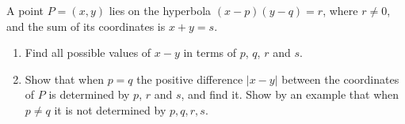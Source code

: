 A point $P=(x,y)$ lies on the hyperbola $(x-p)(y-q)=r$, where $r\ne0$, and the sum of its coordinates is $x+y=s$.
\begin{enumerate}
\item[(a)] Find all possible values of $x-y$ in terms of $p$, $q$, $r$ and $s$.
\item[(b)] Show that when $p=q$ the positive difference $|x-y|$ between the coordinates of $P$ is determined by $p$, $r$ and $s$, and find it. Show by an example that when $p\ne q$ it is not determined by $p,q,r,s$.
\end{enumerate}
